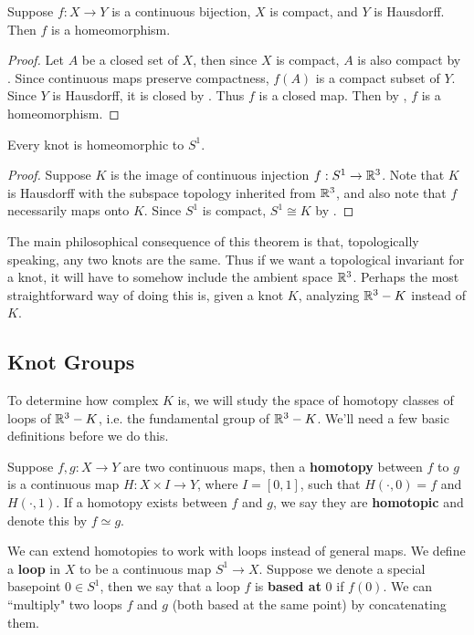 \documentclass[twoside,10pt]{article}
\begin{document}
\begin{lem}
	\label{compact-haus-homeo}
Suppose $f:X\to Y$ is a continuous bijection, $X$ is compact, and $Y$ is Hausdorff. Then $f$ is a homeomorphism.
\end{lem}
\begin{proof}
	Let $A$ be a closed set of $X$, then since $X$ is compact, $A$ is also compact by . Since continuous maps preserve compactness, $f(A)$ is a compact subset of $Y$. Since $Y$ is Hausdorff, it is closed by . Thus $f$ is a closed map. Then by , $f$ is a homeomorphism.
\end{proof}

\begin{thrm}[]
	Every knot is homeomorphic to $S^{1}$.
\end{thrm}
\begin{proof}
	Suppose $K$ is the image of continuous injection $f:S^{1}\to \mathbb{R}^{3}$. Note that $K$ is Hausdorff with the subspace topology inherited from $\mathbb{R}^{3}$, and also note that $f$ necessarily maps onto $K$. Since $S^{1}$ is compact, $S^{1}\cong K$ by .
\end{proof}

The main philosophical consequence of this theorem is that, topologically speaking, any two knots are the same. Thus if we want a topological invariant for a knot, it will have to somehow include the ambient space $\mathbb{R}^{3}$. Perhaps the most straightforward way of doing this is, given a knot $K$, analyzing $\mathbb{R}^{3}-K$ instead of $K$.

\subsection{Knot Groups}

To determine how complex $K$ is, we will study the space of homotopy classes of loops of $\mathbb{R}^{3}-K$, i.e. the fundamental group of $\mathbb{R}^{3}-K$. We'll need a few basic definitions before we do this.

Suppose $f,g:X\to Y$ are two continuous maps, then a \textbf{homotopy} between $f$ to $g$ is a continuous map $H:X\times I \to Y$, where $I=[0,1]$, such that $H(\cdot,0) = f$ and $H(\cdot,1)$. If a homotopy exists between $f$ and $g$, we say they are \textbf{homotopic} and denote this by $f \simeq g$.

We can extend homotopies to work with loops instead of general maps. We define a \textbf{loop} in $X$ to be a continuous map $S^{1}\to X$. Suppose we denote a special basepoint $0 \in S^{1}$, then we say that a loop $f$ is \textbf{based at} $0$ if $f(0)$. We can ``multiply" two loops $f$ and $g$ (both based at the same point) by concatenating them.
\end{document}
